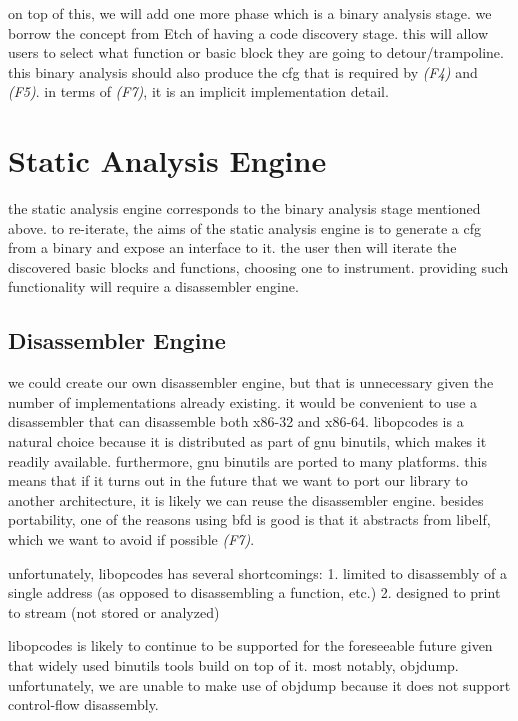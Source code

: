 on top of this, we will add one more phase which is a binary analysis stage. we borrow the concept from Etch of having a code discovery stage. this will allow users to select what function or basic block they are going to detour/trampoline. this binary analysis should also produce the cfg that is required by \emph{(F4)} and \emph{(F5)}. in terms of \emph{(F7)}, it is an implicit implementation detail.

\section{Static Analysis Engine}

the static analysis engine corresponds to the binary analysis stage mentioned above. to re-iterate, the aims of the static analysis engine is to generate a cfg from a binary and expose an interface to it. the user then will iterate the discovered basic blocks and functions, choosing one to instrument. providing such functionality will require a disassembler engine.

\subsection{Disassembler Engine}

we could create our own disassembler engine, but that is unnecessary given the number of implementations already existing. it would be convenient to use a disassembler that can disassemble both x86-32 and x86-64. libopcodes is a natural choice because it is distributed as part of gnu binutils, which makes it readily available. furthermore, gnu binutils are ported to many platforms. this means that if it turns out in the future that we want to port our library to another architecture, it is likely we can reuse the disassembler engine. besides portability, one of the reasons using bfd is good is that it abstracts from libelf, which we want to avoid if possible \emph{(F7)}.

unfortunately, libopcodes has several shortcomings:
1. limited to disassembly of a single address (as opposed to disassembling a function, etc.)
2. designed to print to stream (not stored or analyzed)

libopcodes is likely to continue to be supported for the foreseeable future given that widely used binutils tools build on top of it. most notably, objdump. unfortunately, we are unable to make use of objdump because it does not support control-flow disassembly.


